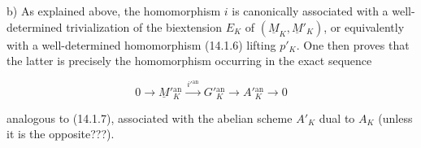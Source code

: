 \smallskip
\noindent
b) As explained above, the homomorphism $i$ is canonically associated
with a well-determined trivialization of the biextension $E_K$ of
$(\underline M_K,\underline M'_K)$, or equivalently with a
well-determined homomorphism (14.1.6) lifting $p'_K$.  One then proves
that the latter is precisely the homomorphism occurring in the exact
sequence

\begin{equation}\tag{14.1.13}
 0\longrightarrow\underline M'{}^{\mathrm{an}}_K
 \xrightarrow{\ i'{}^{\mathrm{an}}\ }G'{}^{\mathrm{an}}_K
 \longrightarrow A'{}^{\mathrm{an}}_K\longrightarrow0
\end{equation}

\noindent
analogous to (14.1.7), associated with the abelian scheme $A'_K$ dual
to $A_K$ (unless it is the opposite???).
